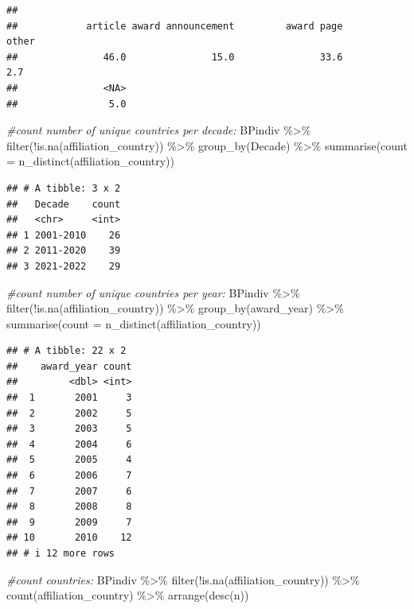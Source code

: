 \documentclass[
]{article}
\newenvironment{Shaded}{\begin{snugshade}}{\end{snugshade}}
\newcommand{\AttributeTok}[1]{\textcolor[rgb]{0.77,0.63,0.00}{#1}}
\newcommand{\CommentTok}[1]{\textcolor[rgb]{0.56,0.35,0.01}{\textit{#1}}}
\newcommand{\FunctionTok}[1]{\textcolor[rgb]{0.00,0.00,0.00}{#1}}
\newcommand{\NormalTok}[1]{#1}
\newcommand{\SpecialCharTok}[1]{\textcolor[rgb]{0.00,0.00,0.00}{#1}}
\begin{document}
\begin{verbatim}
## 
##            article award announcement         award page              other 
##               46.0               15.0               33.6                2.7 
##               <NA> 
##                5.0
\end{verbatim}

\begin{Shaded}
\begin{Highlighting}[]
\CommentTok{\#count number of unique countries per decade:}
\NormalTok{BPindiv }\SpecialCharTok{\%\textgreater{}\%} 
  \FunctionTok{filter}\NormalTok{(}\SpecialCharTok{!}\FunctionTok{is.na}\NormalTok{(affiliation\_country)) }\SpecialCharTok{\%\textgreater{}\%} 
  \FunctionTok{group\_by}\NormalTok{(Decade) }\SpecialCharTok{\%\textgreater{}\%} 
  \FunctionTok{summarise}\NormalTok{(}\AttributeTok{count =} \FunctionTok{n\_distinct}\NormalTok{(affiliation\_country))}
\end{Highlighting}
\end{Shaded}

\begin{verbatim}
## # A tibble: 3 x 2
##   Decade    count
##   <chr>     <int>
## 1 2001-2010    26
## 2 2011-2020    39
## 3 2021-2022    29
\end{verbatim}

\begin{Shaded}
\begin{Highlighting}[]
\CommentTok{\#count number of unique countries per year:}
\NormalTok{BPindiv }\SpecialCharTok{\%\textgreater{}\%} 
  \FunctionTok{filter}\NormalTok{(}\SpecialCharTok{!}\FunctionTok{is.na}\NormalTok{(affiliation\_country)) }\SpecialCharTok{\%\textgreater{}\%} 
  \FunctionTok{group\_by}\NormalTok{(award\_year) }\SpecialCharTok{\%\textgreater{}\%} 
  \FunctionTok{summarise}\NormalTok{(}\AttributeTok{count =} \FunctionTok{n\_distinct}\NormalTok{(affiliation\_country))}
\end{Highlighting}
\end{Shaded}

\begin{verbatim}
## # A tibble: 22 x 2
##    award_year count
##         <dbl> <int>
##  1       2001     3
##  2       2002     5
##  3       2003     5
##  4       2004     6
##  5       2005     4
##  6       2006     7
##  7       2007     6
##  8       2008     8
##  9       2009     7
## 10       2010    12
## # i 12 more rows
\end{verbatim}

\begin{Shaded}
\begin{Highlighting}[]
\CommentTok{\#count countries:}
\NormalTok{BPindiv }\SpecialCharTok{\%\textgreater{}\%} 
  \FunctionTok{filter}\NormalTok{(}\SpecialCharTok{!}\FunctionTok{is.na}\NormalTok{(affiliation\_country)) }\SpecialCharTok{\%\textgreater{}\%} 
  \FunctionTok{count}\NormalTok{(affiliation\_country) }\SpecialCharTok{\%\textgreater{}\%} 
  \FunctionTok{arrange}\NormalTok{(}\FunctionTok{desc}\NormalTok{(n))}
\end{Highlighting}
\end{Shaded}
\end{document}
